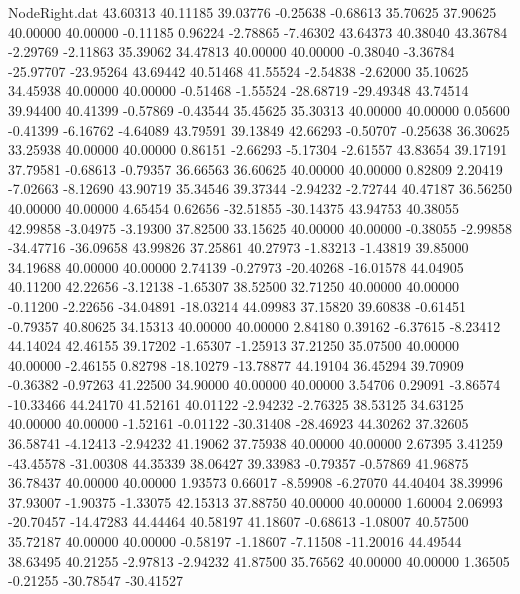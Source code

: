 \begin{filecontents}{NodeRight.dat}
  43.60313   40.11185   39.03776    -0.25638   -0.68613   35.70625   37.90625   40.00000   40.00000   -0.11185    0.96224   -2.78865   -7.46302
  43.64373   40.38040   43.36784    -2.29769   -2.11863   35.39062   34.47813   40.00000   40.00000   -0.38040   -3.36784  -25.97707  -23.95264
  43.69442   40.51468   41.55524    -2.54838   -2.62000   35.10625   34.45938   40.00000   40.00000   -0.51468   -1.55524  -28.68719  -29.49348
  43.74514   39.94400   40.41399    -0.57869   -0.43544   35.45625   35.30313   40.00000   40.00000    0.05600   -0.41399   -6.16762   -4.64089
  43.79591   39.13849   42.66293    -0.50707   -0.25638   36.30625   33.25938   40.00000   40.00000    0.86151   -2.66293   -5.17304   -2.61557
  43.83654   39.17191   37.79581    -0.68613   -0.79357   36.66563   36.60625   40.00000   40.00000    0.82809    2.20419   -7.02663   -8.12690
  43.90719   35.34546   39.37344    -2.94232   -2.72744   40.47187   36.56250   40.00000   40.00000    4.65454    0.62656  -32.51855  -30.14375
  43.94753   40.38055   42.99858    -3.04975   -3.19300   37.82500   33.15625   40.00000   40.00000   -0.38055   -2.99858  -34.47716  -36.09658
  43.99826   37.25861   40.27973    -1.83213   -1.43819   39.85000   34.19688   40.00000   40.00000    2.74139   -0.27973  -20.40268  -16.01578
  44.04905   40.11200   42.22656    -3.12138   -1.65307   38.52500   32.71250   40.00000   40.00000   -0.11200   -2.22656  -34.04891  -18.03214
  44.09983   37.15820   39.60838    -0.61451   -0.79357   40.80625   34.15313   40.00000   40.00000    2.84180    0.39162   -6.37615   -8.23412
  44.14024   42.46155   39.17202    -1.65307   -1.25913   37.21250   35.07500   40.00000   40.00000   -2.46155    0.82798  -18.10279  -13.78877
  44.19104   36.45294   39.70909    -0.36382   -0.97263   41.22500   34.90000   40.00000   40.00000    3.54706    0.29091   -3.86574  -10.33466
  44.24170   41.52161   40.01122    -2.94232   -2.76325   38.53125   34.63125   40.00000   40.00000   -1.52161   -0.01122  -30.31408  -28.46923
  44.30262   37.32605   36.58741    -4.12413   -2.94232   41.19062   37.75938   40.00000   40.00000    2.67395    3.41259  -43.45578  -31.00308
  44.35339   38.06427   39.33983    -0.79357   -0.57869   41.96875   36.78437   40.00000   40.00000    1.93573    0.66017   -8.59908   -6.27070
  44.40404   38.39996   37.93007    -1.90375   -1.33075   42.15313   37.88750   40.00000   40.00000    1.60004    2.06993  -20.70457  -14.47283
  44.44464   40.58197   41.18607    -0.68613   -1.08007   40.57500   35.72187   40.00000   40.00000   -0.58197   -1.18607   -7.11508  -11.20016
  44.49544   38.63495   40.21255    -2.97813   -2.94232   41.87500   35.76562   40.00000   40.00000    1.36505   -0.21255  -30.78547  -30.41527

\end{filecontents}
